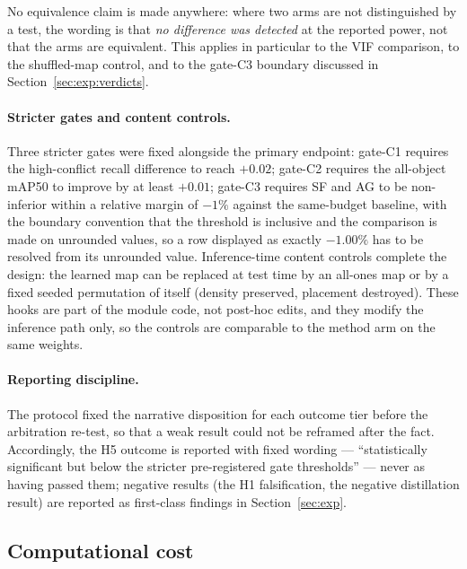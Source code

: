 \documentclass[pdflatex,sn-mathphys-num]{sn-jnl}
\theoremstyle{thmstyleone}%
\theoremstyle{thmstyletwo}%
\theoremstyle{thmstylethree}%
\begin{document}
No equivalence claim is made anywhere: where two arms are not distinguished by a test, the wording is that \emph{no difference was detected} at the reported power, not that the arms are equivalent. This applies in particular to the VIF comparison, to the shuffled-map control, and to the gate-C3 boundary discussed in Section~\ref{sec:exp:verdicts}.

\paragraph{Stricter gates and content controls.} Three stricter gates were fixed alongside the primary endpoint: gate-C1 requires the high-conflict recall difference to reach $+0.02$; gate-C2 requires the all-object mAP50 to improve by at least $+0.01$; gate-C3 requires SF and AG to be non-inferior within a relative margin of $-1\%$ against the same-budget baseline, with the boundary convention that the threshold is inclusive and the comparison is made on unrounded values, so a row displayed as exactly $-1.00\%$ has to be resolved from its unrounded value. Inference-time content controls complete the design: the learned map can be replaced at test time by an all-ones map or by a fixed seeded permutation of itself (density preserved, placement destroyed). These hooks are part of the module code, not post-hoc edits, and they modify the inference path only, so the controls are comparable to the method arm on the same weights.

\paragraph{Reporting discipline.}
The protocol fixed the narrative disposition for each outcome tier before the arbitration re-test, so that a weak result could not be reframed after the fact. Accordingly, the H5 outcome is reported with fixed wording --- ``statistically significant but below the stricter pre-registered gate thresholds'' --- never as having passed them; negative results (the H1 falsification, the negative distillation result) are reported as first-class findings in Section~\ref{sec:exp}.

\subsection{Computational cost}\label{sec:methods:cost}
\end{document}
